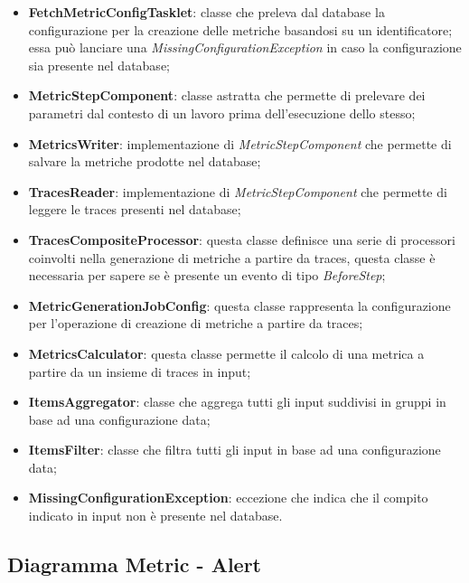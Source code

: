         \begin{itemize}
        	\item \textbf{FetchMetricConfigTasklet}: classe che preleva dal database la configurazione per la 
        		creazione delle metriche basandosi su un identificatore; essa può lanciare una 
        		\textit{MissingConfigurationException} in caso la configurazione sia presente nel database;
        	\item \textbf{MetricStepComponent}: classe astratta che permette di prelevare dei parametri dal contesto 
        		di un lavoro prima dell'esecuzione dello stesso;
        	\item \textbf{MetricsWriter}: implementazione di \textit{MetricStepComponent} che permette di salvare
        		la metriche prodotte nel database;
        	\item \textbf{TracesReader}: implementazione di \textit{MetricStepComponent} che permette di leggere
        		le traces presenti nel database;
        	\item \textbf{TracesCompositeProcessor}: questa classe definisce una serie di processori coinvolti
        		nella generazione di metriche a partire da traces, questa classe è necessaria per sapere 
        		se è presente un evento di tipo \textit{BeforeStep};
        	\item \textbf{MetricGenerationJobConfig}: questa classe rappresenta la configurazione per l'operazione
        		di creazione di metriche a partire da traces;
        	\item \textbf{MetricsCalculator}: questa classe permette il calcolo di una metrica a partire da un 
        		insieme di traces in input;
        	\item \textbf{ItemsAggregator}: classe che aggrega tutti gli input suddivisi in gruppi in base 
        		ad una configurazione data;
        	\item \textbf{ItemsFilter}: classe che filtra tutti gli input in base ad una configurazione data;
        	\item \textbf{MissingConfigurationException}: eccezione che indica che il compito indicato in 
        		input non è presente nel database.
        \end{itemize}

\newpage

    \subsection{Diagramma Metric - Alert}

